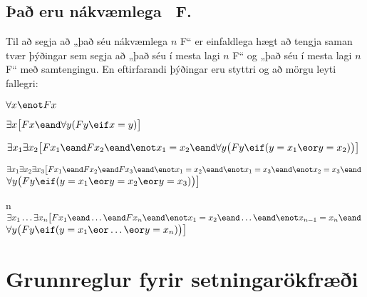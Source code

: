 \subsection*{Það eru nákvæmlega \blank\ F.}
\label{summary.exactly}

Til að segja að „það séu nákvæmlega $n$ F“ er einfaldlega hægt að tengja saman tvær þýðingar sem segja að „það séu í mesta lagi $n$ F“ og „það séu í mesta lagi $n$ F“ með samtengingu. En eftirfarandi þýðingar eru styttri og að mörgu leyti fallegri:
\begin{ekey}
\item[\text{núll}] $\forall x\enot Fx$
\item[\text{eitt}] $\exists x\bigl[Fx \eand \forall y(Fy \eif x= y)\bigr]$
\item[\text{tvö}] $\exists x_1\exists x_2\bigl[Fx_1 \eand Fx_2 \eand \enot x_1 = x_2 \eand \forall y\bigl(Fy \eif (y= x_1 \eor y = x_2)\bigr) \bigr]$
\item[\text{þrjú}] $\exists x_1\exists x_2\exists x_3\bigl[Fx_1 \eand Fx_2 \eand Fx_3 \eand \enot x_1 =  x_2 \eand \enot  x_1 = x_3 \eand \enot x_2 = x_3 \eand \phantom{.}$\\
\phantom{$\exists x_1 \exists x_2$}$\forall y\bigl(Fy \eif (y = x_1 \eor y = x_2 \eor y =  x_3)\bigr) \bigr]$
\item[n] $\exists x_1\ldots\exists x_n\bigl[Fx_1 \eand\ldots\eand Fx_n  \eand \enot x_1 = x_2 \eand\ldots\eand \enot x_{n-1}= x_n \eand \phantom{.}$\\
\phantom{$\exists x_1\exists x_2$}$\forall y\bigl(Fy \eif (y= x_1 \eor \ldots \eor y= x_n)\bigr)\bigr]$ 
\end{ekey}


\label{ProofRules}
\newpage\section{Grunnreglur fyrir setningarökfræði}
\renewenvironment{proof}
	{\noindent\par\noindent\small$\begin{nd}}
	{\end{nd}$\noindent\normalsize\ignorespacesafterend}

